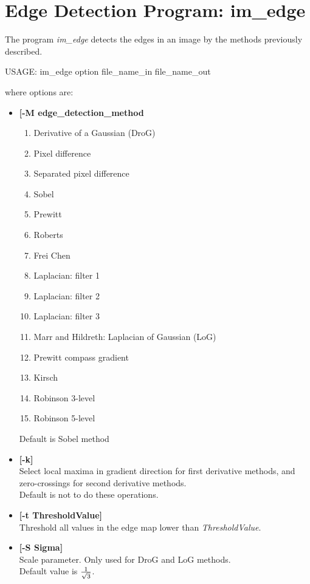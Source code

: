 \section{Edge Detection Program: im\_edge}
The program {\em im\_edge} detects the edges in an image by the
methods previously described.
{\bf
\begin{center}
     USAGE: im\_edge option file\_name\_in file\_name\_out
\end{center}}
where options are: 
\begin{itemize} 
\baselineskip=0.4truecm
\item {\bf [-M edge\_detection\_method}
{\small
\begin{enumerate}
\baselineskip=0.4truecm
\itemsep=0.1truecm
\item Derivative of a Gaussian (DroG) 
\item Pixel difference 
\item Separated pixel difference 
\item Sobel 
\item Prewitt 
\item Roberts 
\item Frei Chen 
\item Laplacian: filter 1 
\item Laplacian: filter 2 
\item Laplacian: filter 3 
\item Marr and Hildreth: Laplacian of Gaussian (LoG) 
\item Prewitt compass gradient 
\item Kirsch 
\item Robinson 3-level 
\item Robinson 5-level 
\end{enumerate}}
Default is Sobel method
\item {\bf [-k]} \\
Select local maxima in gradient direction for first derivative methods,
and zero-crossings for second derivative methods. \\
Default is not to do these operations.
\item {\bf [-t ThresholdValue]} \\
Threshold all values in the edge map lower than {\em ThresholdValue}.
\item {\bf [-S Sigma]} \\
Scale parameter. Only used for DroG and LoG methods. \\
Default value is ${1 \over \sqrt{3}}$.
\end{itemize}


